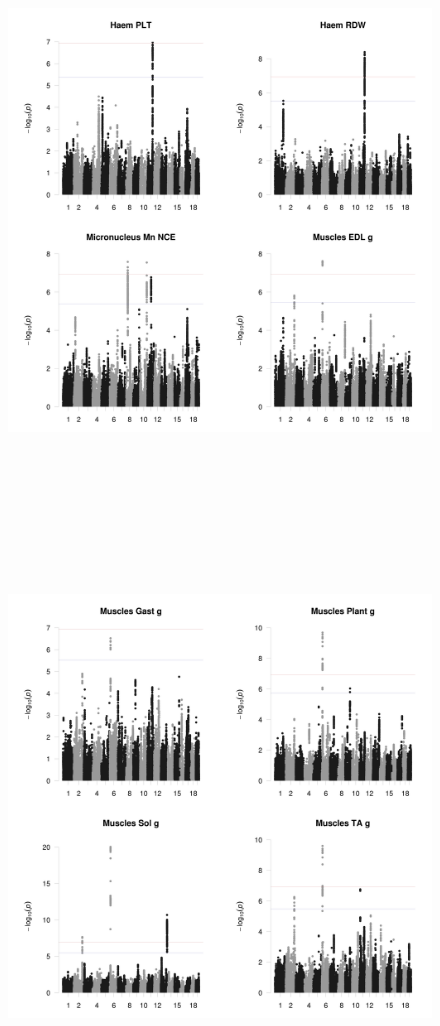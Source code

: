 \documentclass{article}
\begin{document}
\begin{figure}
\begin{center}
\includegraphics[width=15cm, height=15cm]{29.jpeg}
\end{center}
\end{figure}


\begin{figure}
\begin{center}
\includegraphics[width=15cm, height=15cm]{33.jpeg}
\end{center}
\end{figure}
\end{document}
